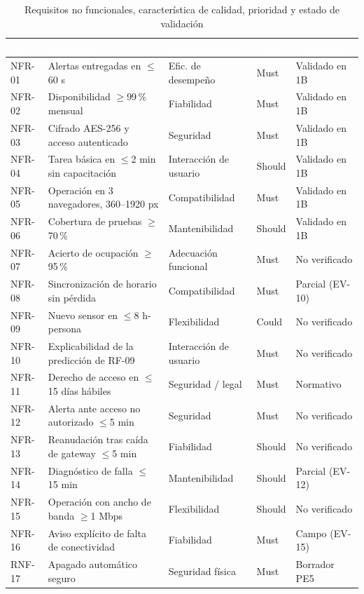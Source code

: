 \begin{table}[H]
\centering
\small
\begin{tabular}{|l|p{5.0cm}|l|l|p{3.3cm}|}
\hline
\cellcolor{sigagreen}\textcolor{white}{\textbf{ID}} & \cellcolor{sigagreen}\textcolor{white}{\textbf{Requisito}} & \cellcolor{sigagreen}\textcolor{white}{\textbf{Caracter\'istica}} & \cellcolor{sigagreen}\textcolor{white}{\textbf{Prior.}} & \cellcolor{sigagreen}\textcolor{white}{\textbf{Validaci\'on}} \\ \hline
NFR-01 & Alertas entregadas en $\leq$60 s & Efic. de desempe\~no & Must & Validado en 1B \\ \hline
NFR-02 & Disponibilidad $\geq$99\,\% mensual & Fiabilidad & Must & Validado en 1B \\ \hline
NFR-03 & Cifrado AES-256 y acceso autenticado & Seguridad & Must & Validado en 1B \\ \hline
NFR-04 & Tarea b\'asica en $\leq$2 min sin capacitaci\'on & Interacci\'on de usuario & Should & Validado en 1B \\ \hline
NFR-05 & Operaci\'on en 3 navegadores, 360--1920 px & Compatibilidad & Must & Validado en 1B \\ \hline
NFR-06 & Cobertura de pruebas $\geq$70\,\% & Mantenibilidad & Should & Validado en 1B \\ \hline
NFR-07 & Acierto de ocupaci\'on $\geq$95\,\% & Adecuaci\'on funcional & Must & No verificado \\ \hline
NFR-08 & Sincronizaci\'on de horario sin p\'erdida & Compatibilidad & Must & Parcial (EV-10) \\ \hline
NFR-09 & Nuevo sensor en $\leq$8 h-persona & Flexibilidad & Could & No verificado \\ \hline
NFR-10 & Explicabilidad de la predicci\'on de RF-09 & Interacci\'on de usuario & Must & No verificado \\ \hline
NFR-11 & Derecho de acceso en $\leq$15 d\'ias h\'abiles & Seguridad / legal & Must & Normativo \\ \hline
NFR-12 & Alerta ante acceso no autorizado $\leq$5 min & Seguridad & Must & No verificado \\ \hline
NFR-13 & Reanudaci\'on tras ca\'ida de gateway $\leq$5 min & Fiabilidad & Should & No verificado \\ \hline
NFR-14 & Diagn\'ostico de falla $\leq$15 min & Mantenibilidad & Should & Parcial (EV-12) \\ \hline
NFR-15 & Operaci\'on con ancho de banda $\geq$1 Mbps & Flexibilidad & Should & No verificado \\ \hline
NFR-16 & Aviso expl\'icito de falta de conectividad & Fiabilidad & Must & Campo (EV-15) \\ \hline
RNF-17 & Apagado autom\'atico seguro & Seguridad f\'isica & Must & Borrador PE5 \\ \hline
\end{tabular}
\caption{Requisitos no funcionales, caracter\'istica de calidad, prioridad y estado de validaci\'on}
\label{tab:catalogo-rnf}
\end{table}

